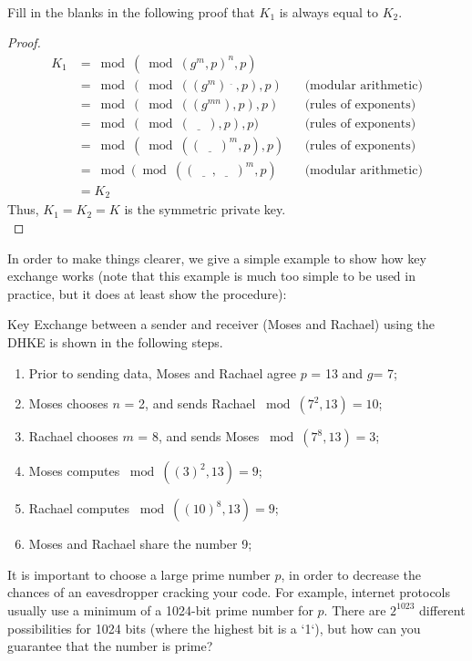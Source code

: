 \begin{exer}\\
Fill in the blanks in the following proof that  $K_1$ is always equal to  $K_2$.\\
  	\begin{proof} 
		\begin{align*} 
		K_1 &=   \bmod ( \bmod (g^m , p)^n , p ) 
           	\\&=  \bmod ( \bmod ((g^m)^{\underline{~~~~}} , p) , p )&& \text{(modular arithmetic)}	%
		\\&= \bmod ( \bmod ((g^{mn}) , p) , p )&&  \text{(rules of exponents)}	%
           	\\&= \bmod ( \bmod (\underline{~~~~~~}) , p) , p ) &&\text{(rules of exponents)}	%
           	\\&= \bmod ( \bmod ((\underline{~~~~~~})^m , p) , p )  &&\text{(rules of exponents)}	%
           	\\&= \bmod ( \bmod ((\underline{~~~~~~} , \underline{~~~~~~})^m , p )&&\text{(modular arithmetic)}   	%
		\\&= K_2
		\end{align*} 
   	Thus, $K_1 = K_2 = K$ is the symmetric private key.\\

  	\end{proof}
\end{exer}

In order to make things clearer, we give a simple example to show how key exchange works (note that this example is much too simple to be used in practice, but it does at least show the procedure):

 \begin{eg} Key Exchange between a sender and receiver (Moses and Rachael) using the DHKE is shown in the following steps.
\begin{enumerate}[Step 1.]
\item Prior to sending data, Moses and Rachael agree $p$ = 13 and $g$= 7; 
\item Moses chooses $n$ = 2, and sends Rachael $\bmod (7^2 , 13) = 10$;
\item Rachael chooses $m$ = 8, and sends Moses $\bmod (7^8  , 13) = 3 $;
\item Moses computes $\bmod ((3)^2 , 13 ) = 9$;
\item Rachael computes $\bmod ((10)^8 , 13 ) = 9$;
\item Moses and Rachael share the number 9;
\end{enumerate}
\end{eg}
It is important to choose a large prime number $p$, in order to decrease the chances of an eavesdropper cracking your code.  For example, internet protocols usually use a minimum of a 1024-bit prime number for $p$.  There are $2^{1023}$ different possibilities for 1024 bits (where the highest bit is a `1`), but how can you guarantee that the number is prime?

